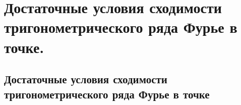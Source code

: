 \chapter{Достаточные условия сходимости тригонометрического ряда Фурье в точке.}
\section{Достаточные условия сходимости тригонометрического ряда Фурье в точке}